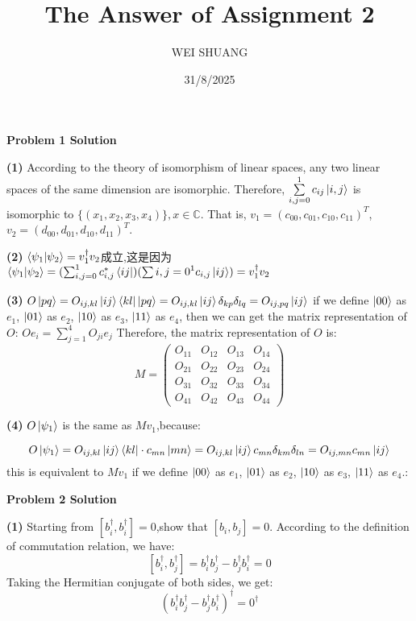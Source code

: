 \documentclass[12pt]{article}
\title{The Answer of Assignment 2}
\author{WEI SHUANG}
\date{31/8/2025}
\begin{document}
\maketitle

\begin{center}
    \textbf{Problem 1 Solution}
\end{center}

\textbf{(1)}
According to the theory of isomorphism of linear spaces, any two linear spaces of the same dimension are isomorphic. Therefore, $\sum\limits_{i,j=0}^{1}c_{ij}\ket{i,j}$ is isomorphic to $\{(x_1,x_2,x_3,x_4)\}, x\in \mathbb{C}$. That is, $v_1=(c_{00},c_{01},c_{10},c_{11})^T$, $v_2=(d_{00},d_{01},d_{10},d_{11})^T$.




\textbf{(2)}
$\braket{\psi_1|\psi_2}=v_1^\dagger v_2$成立,这是因为
$\braket{\psi_1|\psi_2}=(\sum_{i,j=0}^1c_{i,j}^*\bra{ij})(\sum{i,j=0}^1c_{i,j}\ket{ij})=v_1^\dagger v_2$

\textbf{(3)}
$O\ket{pq}=O_{ij,kl}\ket{ij}\bra{kl}\ket{pq}=O_{ij,kl}\ket{ij}\delta_{kp}\delta_{lq}=O_{ij,pq}\ket{ij}$ 
if we define $\ket{00}$ as $e_1$, $\ket{01}$ as $e_2$, $\ket{10}$ as $e_3$, $\ket{11}$ as $e_4$, then we can get the matrix representation of $O$:
$Oe_i=\sum_{j=1}^4O_{ji}e_j$
Therefore, the matrix representation of $O$ is:
\[M=\begin{pmatrix}
O_{11} & O_{12} & O_{13} & O_{14} \\
O_{21} & O_{22} & O_{23} & O_{24} \\
O_{31} & O_{32} & O_{33} & O_{34} \\
O_{41} & O_{42} & O_{43} & O_{44}    
\end{pmatrix}\]

\textbf{(4)}
$O\ket{\psi_1}$ is the same as $Mv_1$,because:

\[
O\ket{\psi_1}=O_{ij,kl}\ket{ij}\bra{kl}\cdot c_{mn}\ket{mn}=O_{ij,kl}\ket{ij}c_{mn}\delta_{km}\delta_{ln}=O_{ij,mn}c_{mn}\ket{ij}
\]
this is equivalent to $Mv_1$ if we define $\ket{00}$ as $e_1$, $\ket{01}$ as $e_2$, $\ket{10}$ as $e_3$, $\ket{11}$ as $e_4$.:

\begin{center}
    \textbf{Problem 2 Solution}
\end{center}

\textbf{(1)}
Starting from $[b_i^\dagger,b_i^\dagger]=0$,show that $[b_i,b_j]=0$.
According to the definition of commutation relation, we have:
\[[b_i^\dagger,b_j^\dagger]=b_i^\dagger b_j^\dagger - b_j^\dagger b_i^\dagger=0\]
Taking the Hermitian conjugate of both sides, we get:
\[(b_i^\dagger b_j^\dagger - b_j^\dagger b_i^\dagger)^\dagger = 0^\dagger\]
\end{document}
